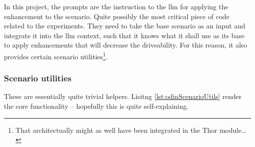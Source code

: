 In this project, the prompts are the instruction to the \acrfull{llm} for
applying the enhancement to the scenario. Quite possibly the most critical piece
of code related to the experiments. They need to take the base scenario as an
input and integrate it into the \acrshort{llm} context, such that it knows what
it shall use as its base to apply enhancements that will decrease the
driveability. For this reason, it also provides certain scenario
utilities\footnote{That architectually might as well have been integrated in the
    Thor module\ldots}.

\subsubsection{Scenario utilities}

These are essentially quite trivial helpers. Lisitng \ref{lst:odinScenarioUtils}
render the core functionality -- hopefully this is quite self-explaining.

